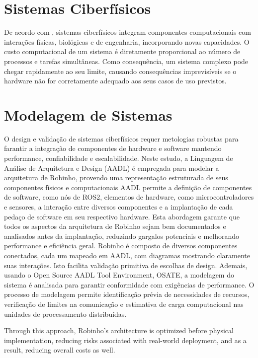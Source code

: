 \documentclass[
    12pt, 
    a4paper, 
    chapter=TITLE,		%
    section=TITLE,		%
    oneside,            %
    english
]{abntex2}
\begin{document}
\section{Sistemas Ciberfísicos}
De acordo com \cite{Moraes2013}, sistemas ciberfísicos integram componentes computacionais com interações físicas, biológicas e de engenharia, incorporando novas capacidades. O custo computacional de um sistema é diretamente proporcional ao número de processos e tarefas simultâneas. Como consequência, um sistema complexo pode chegar rapidamente ao seu limite, causando consequências imprevisíveis se o hardware não for corretamente adequado aos seus casos de uso previstos. \cite{SennBourdon2022}

\section{Modelagem de Sistemas}

O design e validação de sistemas ciberfísicos requer metologias robustas para farantir a integração de componentes de hardware e software mantendo performance, confiabilidade e escalabilidade. Neste estudo, a Linguagem de Análise de Arquitetura e Design (AADL) é empregada para modelar a arquitetura de Robinho, provendo uma representação estruturada de seus componentes físicos e computacionais
AADL permite a definição de componentes de software, como nós de ROS2, elementos de hardware, como microcontroladores e sensores, a interação entre diversos componentes e a implantação de cada pedaço de software em seu respectivo hardware. Esta abordagem garante que todos os aspectos da arquitetura de Robinho sejam bem documentados e analisados antes da implantação, reduzindo gargalos potenciais e melhorando performance e eficiência geral.
Robinho é composto de diversos componentes conectados, cada um mapeado em AADL, com diagramas mostrando claramente suas interações. Isto facilita validação primitiva de escolhas de design. 
Ademais, usando o Open Source AADL Tool Environment, OSATE, a modelagem do sistema é analisada para garantir conformidade com exigências de performance. O processo de modelagem permite identificação prévia de necessidades de recursos, verificação de limites na comunicação e estimativa de carga computacional nas unidades de processamento distribuídas.

Through this approach, Robinho's architecture is optimized before physical implementation, reducing risks associated with real-world deployment, and as a result, reducing overall costs as well.
\end{document}
